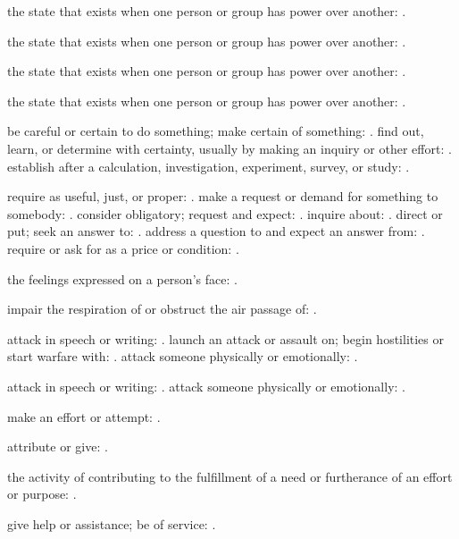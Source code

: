   the state that exists when one person or group has power over another: .

  the state that exists when one person or group has power over another: .

  the state that exists when one person or group has power over another: .

  the state that exists when one person or group has power over another: .

  be careful or certain to do something; make certain of something: . find out, learn, or determine with certainty, usually by making an inquiry or other effort: . establish after a calculation, investigation, experiment, survey, or study: .

  require as useful, just, or proper: . make a request or demand for something to somebody: . consider obligatory; request and expect: . inquire about: . direct or put; seek an answer to: . address a question to and expect an answer from: . require or ask for as a price or condition: .

  the feelings expressed on a person's face: .

  impair the respiration of or obstruct the air passage of: .

  attack in speech or writing: . launch an attack or assault on; begin hostilities or start warfare with: . attack someone physically or emotionally: .

  attack in speech or writing: . attack someone physically or emotionally: .

  make an effort or attempt: .

  attribute or give: .

  the activity of contributing to the fulfillment of a need or furtherance of an effort or purpose: .

  give help or assistance; be of service: .

